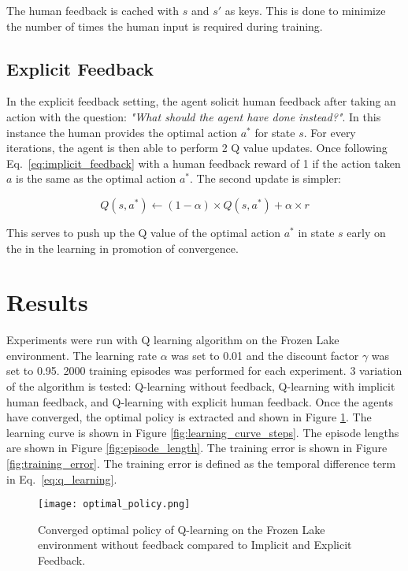 \documentclass[conference]{IEEEtran}
\begin{document}
The human feedback is cached with \(s\) and \(s'\) as keys. This is done to minimize the number of times the human input is required during training.

\subsection{Explicit Feedback}

In the explicit feedback setting, the agent solicit human feedback after taking an action with the question: \textit{"What should the agent have done instead?"}. In this instance the human provides the optimal action \(a^*\) for state \(s\). For every iterations, the agent is then able to perform 2 Q value updates. Once following Eq.~\ref{eq:implicit_feedback} with a human feedback reward of 1 if the action taken \(a\) is the same as the optimal action \(a^*\). The second update is simpler:

\begin{equation}
    Q(s, a^*) \leftarrow (1-\alpha) \times Q(s, a^*) + \alpha \times r
    \label{eq:explicit_feedback}
\end{equation}

This serves to push up the Q value of the optimal action \(a^*\) in state \(s\) early on the in the learning in promotion of convergence.

\section{Results}

Experiments were run with Q learning algorithm on the Frozen Lake environment. The learning rate \(\alpha\) was set to 0.01 and the discount factor \(\gamma\) was set to 0.95. 2000 training episodes was performed for each experiment. 3 variation of the algorithm is tested: Q-learning without feedback, Q-learning with implicit human feedback, and Q-learning with explicit human feedback. Once the agents have converged, the optimal policy is extracted and shown in Figure \ref{fig:optimal_policy}. The learning curve is shown in Figure \ref{fig:learning_curve_steps}. The episode lengths are shown in Figure \ref{fig:episode_length}. The training error is shown in Figure \ref{fig:training_error}. The training error is defined as the temporal difference term in Eq.~\ref{eq:q_learning}.

\begin{figure}
    \centering
    \texttt{[image: optimal\_policy.png]}
    \caption{Converged optimal policy of Q-learning on the Frozen Lake environment without feedback compared to Implicit and Explicit Feedback.}
    \label{fig:optimal_policy}
\end{figure}
\end{document}
